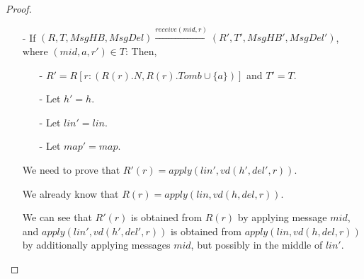 {\begin {proof}
\begin{itemize}
    We need to prove that $R'(r) = \mathit{apply}(\mathit{lin}',\mathit{vd}(h',\mathit{del}',r))$.

    We already know that $R(r) = \mathit{apply}(\mathit{lin},\mathit{vd}(h,\mathit{del},r))$.

    We can see that $R'(r)$ is obtained from $R(r)$ by applying message $\mathit{mid}$, and $\mathit{apply}(\mathit{lin}',\mathit{vd}(h',\mathit{del}',r))$ is obtained from $\mathit{apply}(\mathit{lin},\mathit{vd}(h,\mathit{del},r))$ by additionally applying messages $\mathit{mid}$, but possibly in the middle of $\mathit{lin}'$. It is easy to see that $\mathit{map}(\mathit{mid})$ is a $\mathit{add}(a,\_)$ operation. By Lemma \ref{lemma:a property that can be obtained from P for rga}, we can see that there is no $\mathit{add}(a,\_)$ nor $\mathit{rem}(a)$ in $\mathit{vd}(h,\mathit{del},r)$. Thus, for each $\mathit{lin}''$ generated from $\mathit{lin}'$ by postponing message $\mathit{mid}$ to a later position, we can see that $\mathit{apply}(\mathit{lin}'',\mathit{vd}(h',\mathit{del}',r)) = \mathit{apply}(\mathit{lin}',\mathit{vd}(h',\mathit{del}',r))$.

    Therefore, $R'(r) = \mathit{apply}(\mathit{lin}',\mathit{vd}(h',\mathit{del}',r))$.

\item[-] If $(R,T,\mathit{MsgHB},\mathit{MsgDel}) {\xrightarrow{\mathit{receive}(\mathit{mid},r)}} (R',T',\mathit{MsgHB}',\mathit{MsgDel}')$, where $(\mathit{mid},a,r') \in T$: Then,

    \begin{itemize}
    \setlength{\itemsep}{0.5pt}
    \item[-] $R' = R[ r: (R(r).N,R(r).\mathit{Tomb} \cup \{ a \}) ]$ and $T' = T$.

    \item[-] Let $h' = h$.

    \item[-] Let $\mathit{lin}' = \mathit{lin}$.

    \item[-] Let $\mathit{map}' = \mathit{map}$.
    \end{itemize}

    We need to prove that $R'(r) = \mathit{apply}(\mathit{lin}',\mathit{vd}(h',\mathit{del}',r))$.

    We already know that $R(r) = \mathit{apply}(\mathit{lin},\mathit{vd}(h,\mathit{del},r))$.

    We can see that $R'(r)$ is obtained from $R(r)$ by applying message $\mathit{mid}$, and $\mathit{apply}(\mathit{lin}',\mathit{vd}(h',\mathit{del}',r))$ is obtained from $\mathit{apply}(\mathit{lin},\mathit{vd}(h,\mathit{del},r))$ by additionally applying messages $\mathit{mid}$, but possibly in the middle of $\mathit{lin}'$.


\end{itemize}
\end{proof}}
